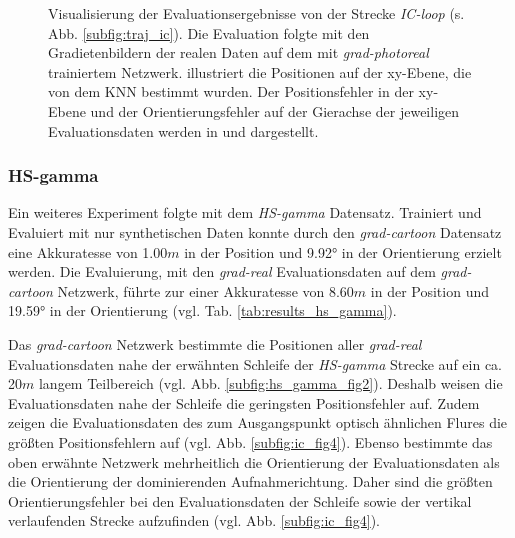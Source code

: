 \begin{figure}
\begin{tabularx}{0.9\textwidth}{>{\centering\arraybackslash}p{} X}
	\end{tabularx}
	\caption{Visualisierung der Evaluationsergebnisse von der Strecke \textit{IC-loop} (s. Abb. \ref{subfig:traj_ic}). Die Evaluation folgte mit den Gradietenbildern der realen Daten auf dem mit \textit{grad-photoreal} trainiertem Netzwerk.  illustriert die Positionen auf der xy-Ebene, die von dem KNN bestimmt wurden. Der Positionsfehler in der xy-Ebene und der Orientierungsfehler auf der Gierachse der jeweiligen Evaluationsdaten werden in   und   dargestellt.}
	\label{fig:result_ic_loop}
\end{figure}


\subsubsection{HS-gamma}

Ein weiteres Experiment folgte mit dem \textit{HS-gamma} Datensatz. Trainiert und Evaluiert mit nur synthetischen Daten konnte durch den \textit{grad-cartoon} Datensatz eine Akkuratesse von 1.00$m$ in der Position und 9.92° in der Orientierung erzielt werden. Die Evaluierung, mit den \textit{grad-real} Evaluationsdaten auf dem \textit{grad-cartoon} Netzwerk, führte zur einer Akkuratesse von 8.60$m$ in der Position und 19.59° in der Orientierung (vgl. Tab. \ref{tab:results_hs_gamma}). 


Das \textit{grad-cartoon} Netzwerk bestimmte die Positionen aller \textit{grad-real} Evaluationsdaten nahe der erwähnten Schleife der \textit{HS-gamma} Strecke auf ein ca. 20$m$ langem Teilbereich (vgl. Abb.  \ref{subfig:hs_gamma_fig2}). Deshalb weisen die Evaluationsdaten nahe der Schleife die geringsten Positionsfehler auf. Zudem zeigen die Evaluationsdaten des zum Ausgangspunkt optisch ähnlichen Flures die größten Positionsfehlern auf (vgl. Abb. \ref{subfig:ic_fig4}). Ebenso bestimmte  das oben erwähnte Netzwerk mehrheitlich die Orientierung der Evaluationsdaten als die Orientierung der dominierenden Aufnahmerichtung. Daher sind die größten Orientierungsfehler bei den Evaluationsdaten der Schleife sowie der vertikal verlaufenden Strecke aufzufinden (vgl. Abb. \ref{subfig:ic_fig4}). 


